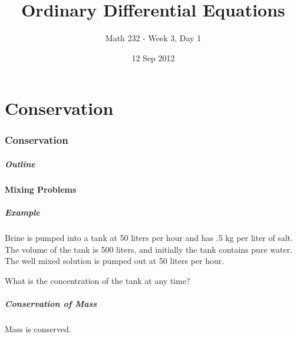 \part{Conservation}
\section{Conservation}

\title{Ordinary Differential Equations}
\subtitle{Math 232 - Week 3, Day 1}
\date{12 Sep 2012}

\begin{frame}
  \titlepage
\end{frame}

\begin{frame}
  \frametitle{Outline}
\end{frame}


\subsection{Mixing Problems}


\begin{frame}
  \frametitle{Example}

  Brine is pumped into a tank at 50 liters per hour and has .5 kg per
  liter of salt. The volume of the tank is 500 liters, and initially
  the tank contains pure water. The well mixed solution is pumped out
  at 50 liters per hour.

  What is the concentration of the tank at any time?

\end{frame}


\begin{frame}
  \frametitle{Conservation of Mass}

  Mass is conserved.



\end{frame}


